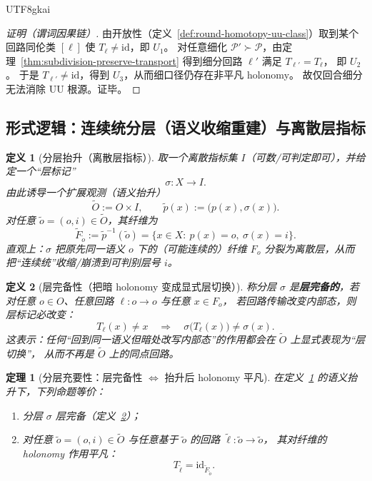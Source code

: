 \documentclass[12pt]{article}
\newtheorem{definition}{定义}[section]
\newtheorem{theorem}{定理}[section]
\begin{document}
\begin{CJK*}{UTF8}{gkai}
\begin{proof}[证明（谓词因果链）]
由开放性（定义~\ref{def:round-homotopy-uu-class}）取到某个回路同伦类 $[\ell]$ 使 $T_{\ell}\neq \mathrm{id}$，即 $U_1$。
对任意细化 $\mathcal{P}'\succ\mathcal{P}$，由定理~\ref{thm:subdivision-preserve-transport} 得到细分回路 $\ell'$ 满足 $T_{\ell'}=T_{\ell}$，
  即 $U_2$。
于是 $T_{\ell'}\neq \mathrm{id}$，得到 $U_3$，从而细口径仍存在非平凡 holonomy。
故仅回合细分无法消除 UU 根源。证毕。
\end{proof}

\subsection{形式逻辑：连续统分层（语义收缩重建）与离散层指标}
\label{sec:layering-discrete-index}

\begin{definition}[分层抬升（离散层指标）]
\label{def:layering-lift}
取一个离散指标集 $I$（可数/可判定即可），并给定一个“层标记”
\[
  \sigma:X\to I.
\]
由此诱导一个扩展观测（语义抬升）
\[
  \widetilde O:=O\times I,\qquad \widetilde p(x):=\bigl(p(x),\sigma(x)\bigr).
\]
对任意 $\widetilde o=(o,i)\in\widetilde O$，其纤维为
\[
  \widetilde F_{\widetilde o}:=\widetilde p^{-1}(\widetilde o)
  =\{x\in X:\ p(x)=o,\ \sigma(x)=i\}.
\]
直观上：$\sigma$ 把原先同一语义 $o$ 下的（可能连续的）纤维 $F_o$ 分裂为离散层，从而把“连续统”收缩/崩溃到可判别层号 $i$。
\end{definition}

\begin{definition}[层完备性（把暗 holonomy 变成显式层切换）]
\label{def:layering-complete}
称分层 $\sigma$ 是\textbf{层完备的}，若对任意 $o\in O$、任意回路 $\ell:o\to o$ 与任意 $x\in F_o$，
若回路传输改变内部态，则层标记必改变：
\[
  T_{\ell}(x)\neq x\quad\Longrightarrow\quad \sigma\bigl(T_{\ell}(x)\bigr)\neq \sigma(x).
\]
这表示：任何“回到同一语义但暗处改写内部态”的作用都会在 $\widetilde O$ 上显式表现为“层切换”，
从而不再是 $\widetilde O$ 上的同点回路。
\end{definition}

\begin{theorem}[分层充要性：层完备性 $\Longleftrightarrow$ 抬升后 holonomy 平凡]
\label{thm:layering-complete-iff-trivial-holonomy}
在定义~\ref{def:layering-lift} 的语义抬升下，下列命题等价：
\begin{enumerate}
  \item 分层 $\sigma$ 层完备（定义~\ref{def:layering-complete}）；
  \item 对任意 $\widetilde o=(o,i)\in\widetilde O$ 与任意基于 $\widetilde o$ 的回路 $\widetilde\ell:\widetilde o\to \widetilde o$，
  其对纤维的 holonomy 作用平凡：
  \[
    T_{\widetilde\ell}=\mathrm{id}_{\widetilde F_{\widetilde o}}.
  \]
\end{enumerate}
\end{theorem}


\end{CJK*}
\end{document}
